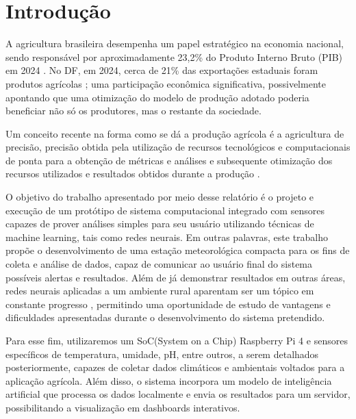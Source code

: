 \section{Introdução}\label{sec:intro}

\indent A agricultura brasileira desempenha um papel estratégico na economia nacional, sendo responsável por aproximadamente 23,2\% do Produto Interno Bruto (PIB) em 2024 \cite{cna2025}. No DF, em 2024, cerca de 21\% das exportações estaduais foram produtos agrícolas \cite{dataviva-graph-2025}; uma participação econômica significativa, possivelmente apontando que uma otimização do modelo de produção adotado poderia beneficiar não só os produtores, mas o restante da sociedade.


Um conceito recente na forma como se dá a produção agrícola é a agricultura de precisão, precisão obtida pela utilização de recursos tecnológicos e computacionais de ponta para a obtenção de métricas e análises e subsequente otimização dos recursos utilizados e resultados obtidos durante a produção \cite{tschiedel_ferreira_2002}.


O objetivo do trabalho apresentado por meio desse relatório é o projeto e execução de um protótipo de sistema computacional integrado com sensores capazes de prover análises simples para seu usuário utilizando técnicas de machine learning, tais como redes neurais. Em outras palavras, este trabalho propõe o desenvolvimento de uma estação meteorológica compacta para os fins de coleta e análise de dados, capaz de comunicar ao usuário final do sistema possíveis alertas e resultados. Além de já demonstrar resultados em outras áreas, redes neurais aplicadas a um ambiente rural aparentam ser um tópico em constante progresso \cite{machine_learning_in_agriculture}, permitindo uma oportunidade de estudo de vantagens e dificuldades apresentadas durante o desenvolvimento do sistema pretendido.


Para esse fim, utilizaremos um SoC(System on a Chip) Raspberry Pi 4 \cite{rpi4} e sensores específicos de temperatura, umidade, pH, entre outros, a serem detalhados posteriormente, capazes de coletar dados climáticos e ambientais voltados para a aplicação agrícola. Além disso, o sistema incorpora um modelo de inteligência artificial que processa os dados localmente e envia os resultados para um servidor, possibilitando a visualização em dashboards interativos.

